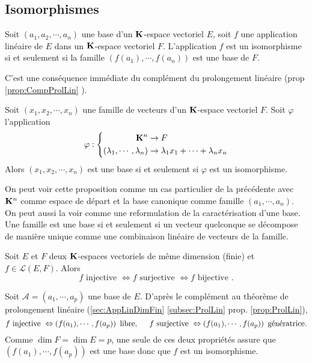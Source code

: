 \subsection{Isomorphismes}
\begin{propn}
 Soit $(a_1,a_2,\cdots,a_n)$ une base d'un $\mathbf{K}$-espace vectoriel $E$, soit $f$ une application linéaire de $E$ dans un $\mathbf{K}$-espace vectoriel $F$. L'application $f$ est un isomorphisme si et seulement si la famille $(f(a_1),\cdots,f(a_n))$ est une base de $F$.
\end{propn}
\begin{demo}
  C'est une conséquence immédiate du complément du prolongement linéaire (prop \ref{prop:CompProlLin} ).
\end{demo}

\begin{propn} \label{prop:isoRn}
 Soit $(x_1,x_2,\cdots,x_n)$ une famille de vecteurs d'un $\mathbf{K}$-espace vectoriel $F$. Soit $\varphi$ l'application
\begin{displaymath}
 \varphi : \left\lbrace 
\begin{aligned}
 \mathbf{K}^n &\rightarrow F \\
(\lambda_1,\cdots,\lambda_n) &\rightarrow \lambda_1 x_1 + \cdots + \lambda_n x_n
\end{aligned}
\right. 
\end{displaymath}
Alors $(x_1, x_2, \cdots, x_n)$ est une base si et seulement si $\varphi$ est un isomorphisme.
\end{propn}
\begin{demo}
On peut voir cette proposition comme un cas particulier de la précédente avec $\mathbf{K}^n$ comme espace de départ et la base canonique comme famille $(a_1, \cdots, a_n)$.\newline
On peut aussi la voir comme une reformulation de la caractérisation d'une base. Une famille est une base si et seulement si un vecteur quelconque se décompose de manière unique comme une combinaison linéaire de vecteurs de la famille.
\end{demo}

\begin{propn}
 Soit $E$ et $F$ deux $\mathbf{K}$-espaces vectoriels de même dimension (finie) et $f\in \mathcal{L}(E,F)$. Alors
\[
 f \text{ injective } \Leftrightarrow  f \text{ surjective } \Leftrightarrow  f \text{ bijective }.
\]
\end{propn}
\begin{demo}
 Soit $\mathcal{A} = (a_1,\cdots,a_p)$ une base de $E$. D'après le complément au théorème de prolongement linéaire (\ref{sec:AppLinDimFin} \ref{subsec:ProlLin} prop. \ref{prop:ProlLin}), 
\[
f \text{ injective }\Leftrightarrow \left( f(a_1), \cdots, f(a_p)\right) \text{ libre}, \hspace{0.5cm}
f \text{ surjective }\Leftrightarrow \left( f(a_1), \cdots, f(a_p)\right) \text{ génératrice}.
\]
Comme $\dim F = \dim E = p$, une seule de ces deux propriétés assure que $\left( f(a_1), \cdots, f(a_p)\right)$ est une base donc que $f$ est un isomorphisme. 
\end{demo}

